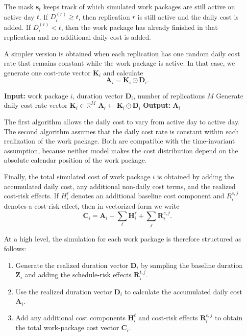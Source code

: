\documentclass[11pt,a4paper]{article}
\newcommand{\1}{\mathbf{1}}
\theoremstyle{definition}
\theoremstyle{plain}
\theoremstyle{remark}
\numberwithin{equation}{section}
\begin{document}
The mask $\mathbf{s}_t$ keeps track of which simulated work packages are still active on active day $t$. If $D_i^{(r)}\geq t$, then replication $r$ is still active and the daily cost is added. If $D_i^{(r)}<t$, then the work package has already finished in that replication and no additional daily cost is added.

A simpler version is obtained when each replication has one random daily cost rate that remains constant while the work package is active. In that case, we generate one cost-rate vector $\mathbf{K}_i$ and calculate
\[
\mathbf{A}_i
=
\mathbf{K}_i\odot \mathbf{D}_i.
\]

\begin{algorithm}[H]
\caption{Simulating accumulated cost with a constant daily cost rate}
\label{alg:mc-accumulated-cost-constant}
\begin{algorithmic}[1]
\State \textbf{Input:} work package $i$, duration vector $\mathbf{D}_i$, number of replications $M$
\State Generate daily cost-rate vector $\mathbf{K}_i\in\mathbb{R}^M$
\State $\mathbf{A}_i \leftarrow \mathbf{K}_i\odot \mathbf{D}_i$
\State \textbf{Output:} $\mathbf{A}_i$
\end{algorithmic}
\end{algorithm}

The first algorithm allows the daily cost to vary from active day to active day. The second algorithm assumes that the daily cost rate is constant within each realization of the work package. Both are compatible with the time-invariant assumption, because neither model makes the cost distribution depend on the absolute calendar position of the work package.

Finally, the total simulated cost of work package $i$ is obtained by adding the accumulated daily cost, any additional non-daily cost terms, and the realized cost-risk effects. If $H_i^\ell$ denotes an additional baseline cost component and $R_i^{c,j}$ denotes a cost-risk effect, then in vectorized form we write
\[
\mathbf{C}_i
=
\mathbf{A}_i
+
\sum_{\ell} \mathbf{H}_i^\ell
+
\sum_j \mathbf{R}_i^{c,j}.
\]

At a high level, the simulation for each work package is therefore structured as follows:
\begin{enumerate}
    \item Generate the realized duration vector $\mathbf{D}_i$ by sampling the baseline duration $\mathbf{Z}_i$ and adding the schedule-risk effects $\mathbf{R}_i^{t,j}$.
    \item Use the realized duration vector $\mathbf{D}_i$ to calculate the accumulated daily cost $\mathbf{A}_i$.
    \item Add any additional cost components $\mathbf{H}_i^\ell$ and cost-risk effects $\mathbf{R}_i^{c,j}$ to obtain the total work-package cost vector $\mathbf{C}_i$.
\end{enumerate}
\end{document}
